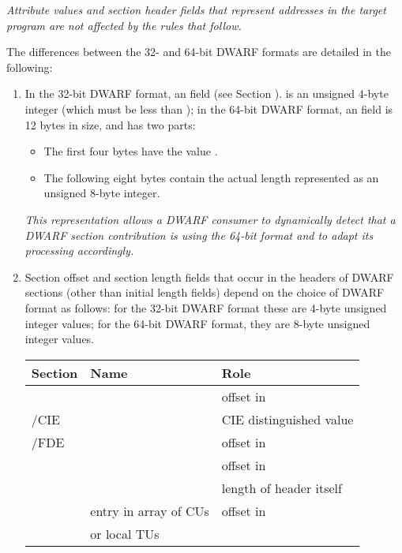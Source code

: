 \bb
\textit{Attribute values and section header fields that represent
addresses in the target program are not affected by the rules that 
follow.}
\eb

The differences between the 32- and 64-bit DWARF formats are
detailed in the following:
\begin{enumerate}[1. ]

\item  In the 32-bit DWARF format, an 
 field 
\bb
(see Section ).
\eb
is an unsigned 4-byte integer (which
must be less than \xfffffffzero); in the 64-bit DWARF format,
an  field is 12 bytes in size,
and has two parts:
\begin{itemize}
\item The first four bytes have the value \xffffffff.

\item  The following eight bytes contain the actual length
represented as an unsigned 8-byte integer.
\end{itemize}

\textit{This representation allows a DWARF consumer to dynamically
detect that a DWARF section contribution is using the 64-bit
format and to adapt its processing accordingly.}

\item \hypertarget{datarep:sectionoffsetlength}{}
Section offset and section length
fields that occur
in the headers of DWARF sections (other than initial length
fields) 
\bb
depend on the choice of DWARF format as follows: for
\eb
the 32-bit DWARF format these are 4-byte unsigned integer values; 
\bb
for
\eb
the 64-bit DWARF format, they are 8-byte unsigned integer values.

\begin{nolinenumbersenv}
\begin{center}
\begin{tabular}{lll}
Section &Name & Role  \\ \hline
\dotdebugaranges{}   & \HFNdebuginfooffset{}   	& offset in \dotdebuginfo{} \\
\dotdebugframe{}/CIE & \HFNCIEid{}              & CIE distinguished value \\
\dotdebugframe{}/FDE & \HFNCIEpointer{}      	& offset in \dotdebugframe{} \\
\dotdebuginfo{}      & \HFNdebugabbrevoffset{}	& offset in \dotdebugabbrev{} \\
\dotdebugline{}      & \HFNheaderlength{}       & length of header itself \\
\dotdebugnames{}     & entry in array of CUs    & offset in \dotdebuginfo{} \\
                     & or local TUs             & \\ 
\hline
\end{tabular}
\end{center}
\end{nolinenumbersenv}


\end{enumerate}

